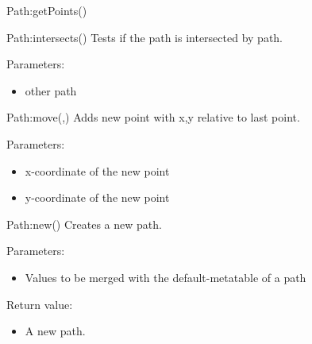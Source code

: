 \begin{luacommand}{{Path:getPoints}()}
\end{luacommand}\begin{luacommand}{{Path:intersects}()}
Tests if the path is intersected by path.

Parameters:
\begin{itemize}
	\item[]  \subitem other path
\end{itemize}



\end{luacommand}\begin{luacommand}{{Path:move}(,)}
Adds new point with x,y relative to last point.

Parameters:
\begin{itemize}
	\item[]  \subitem x-coordinate of the new point\item[]  \subitem y-coordinate of the new point
\end{itemize}



\end{luacommand}\begin{luacommand}{{Path:new}()}
Creates a new path.

Parameters:
\begin{itemize}
	\item[]  \subitem Values to be merged with the default-metatable of a path
\end{itemize}


Return value:
\begin{itemize} \item[] A new path. \end{itemize}


\end{luacommand}
